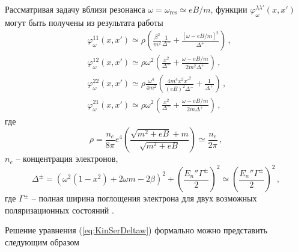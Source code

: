 \documentclass[a4paper]{panl}
\begin{document}
Рассматривая задачу вблизи резонанса $\omega=\omega_\text{res}\simeq eB/m$, функции $\varphi_\omega^{\lambda\lambda'}(x,x')$ могут быть получены из результата работы \cite{YarkovJoPCS:2020}
	\begin{equation}
		\begin{aligned}
		&\varphi_\omega^{11}(x,x')\simeq \rho \left(\frac{\beta^2}{m^2}\frac{1}{\Delta^-} +\frac{\left[\omega-eB/m\right]^2}{\Delta^+}\right)\, ,
		\\
		&\varphi_\omega^{12}(x,x')\simeq \rho \omega^2 \left(
		\frac{x^2}{\Delta^-} + \frac{\omega - eB/m}{2m^2 \Delta^+}
		\right)	\, ,
		\\
		&
		\varphi_\omega^{22}(x,x')\simeq \rho \frac{\omega^4}{4m^2}
		\left(
			 \frac{4m^4x^2 x'^2 }{(eB)^2 \Delta^-} + \frac{1}{\Delta^+}
		\right)\, ,
		\\
		&
				\varphi_\omega^{21}(x,x')\simeq \rho \omega^2
		\left(
		\frac{x^2}{\Delta^-} + \frac{\omega - eB/m}{2m \Delta^+}
		\right)\, ,
		\end{aligned}
	\end{equation}
где
\begin{equation}
\rho = \frac{n_e}{8\pi} e^4 \left(\frac{\sqrt{m^2+eB} + m}{\sqrt{m^2+eB}}\right)\simeq \frac{n_e}{2\pi}\, ,
\end{equation}
$n_e$ -- концентрация электронов,
	\begin{equation}
		\Delta^\pm = (\omega^2(1-x^2)+2 \omega m - 2\beta)^2 + \left(\frac{E_n{''} \Gamma^\pm}{2}\right)^2\simeq \left(\frac{E_n{''} \Gamma^\pm}{2}\right)^2 \, ,
	\end{equation}
	где $\Gamma^\pm$ -- полная ширина поглощения электрона для двух возможных поляризационных состояний \cite{KM_Book_2003}.

Решение уравнения (\ref{eq:KinSerDeltaw}) формально можно представить следующим образом 
\end{document}
